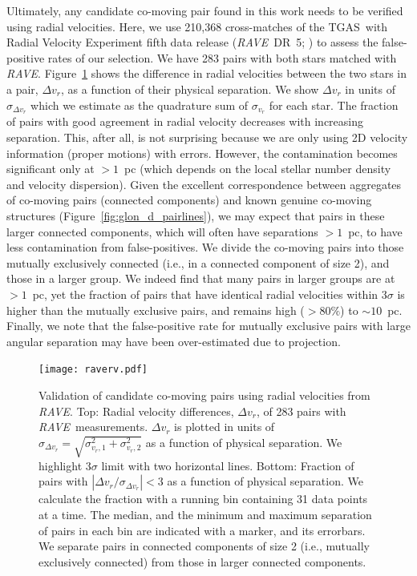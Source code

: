 \documentclass[manuscript, letterpaper]{aastex6}
\newcommand{\project}[1]{\textsl{#1}}
\newcommand{\acronym}[1]{{\small{#1}}}
\newcommand{\rave}{\project{\acronym{RAVE}}}
\newcommand{\tgas}{\acronym{TGAS}}
\begin{document}
Ultimately, any candidate co-moving pair found in this work
needs to be verified using radial velocities.
Here, we use 210,368 cross-matches of the \tgas\ with
Radial Velocity Experiment fifth data release (\rave\ DR~5; \citealt{2017AJ....153...75K}) to
assess the false-positive rates of our selection.
We have 283 pairs with both stars matched with \rave.
Figure~\ref{fig:raverv} shows the difference in radial velocities
between the two stars in a pair, $\Delta v_r$, as a function of their physical separation.
We show $\Delta v_r$ in units of $\sigma_{\Delta v_r}$ which we estimate
as the quadrature sum of $\sigma _{v_r}$ for each star.
The fraction of pairs with good agreement in radial velocity decreases with
increasing separation.
This, after all, is not surprising because we are only using
2D velocity information (proper motions) with errors.
However, the contamination becomes significant only at $>1$~pc
(which depends on the local stellar number density and velocity dispersion).
Given the excellent correspondence between
aggregates of co-moving pairs (connected components)
and known genuine co-moving structures (Figure~\ref{fig:glon_d_pairlines}),
we may expect that pairs in these larger connected components,
which will often have separations $>1$~pc,
to have less contamination from false-positives.
We divide the co-moving pairs into those
mutually exclusively connected (i.e., in a connected component of
size 2), and those in a larger group.
We indeed find that many pairs in larger groups are at $>1$~pc, yet
the fraction of pairs that have identical radial velocities within $3\sigma$ is
higher than the mutually exclusive pairs, and remains high ($>80\%$) to $\sim 10$~pc.
Finally, we note that the false-positive rate for mutually exclusive pairs
with large angular separation may have been over-estimated due to projection.

\begin{figure}[htbp]
  \begin{center}
    \texttt{[image: raverv.pdf]}
  \end{center}
  \caption{%
    Validation of candidate co-moving pairs using radial velocities from \rave.
    Top: Radial velocity differences, $\Delta v_r$, of 283 pairs with \rave\ measurements.
    $\Delta v_r$ is plotted in units of $\sigma_{\Delta v_r} = \sqrt{\sigma_{v_r,1}^2 + \sigma_{v_r,2}^2}$
    as a function of physical separation.
    We highlight $3\sigma$ limit with two horizontal lines.
    Bottom: Fraction of pairs with $|\Delta v_r/\sigma_{\Delta v_r}| <3$
    as a function of physical separation. We calculate the fraction with a running
    bin containing 31 data points at a time.
    The median, and the minimum and maximum separation of pairs in each bin are
    indicated with a marker, and its errorbars.
    We separate pairs in connected components of size 2 (i.e., mutually exclusively connected)
    from those in larger connected components.
    \label{fig:raverv}}
\end{figure}
\end{document}
